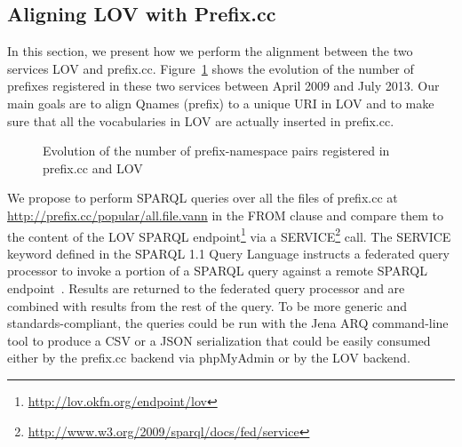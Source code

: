 \subsection{Aligning LOV with Prefix.cc} \label{sec:alignment}
In this section, we present how we perform the alignment between the two services LOV and prefix.cc. Figure~\ref{fig:evolution} shows the evolution of the number of prefixes registered in these two services between April 2009 and July 2013. Our main goals are to align Qnames (prefix) to a unique URI in LOV and to make sure that all the vocabularies in LOV are actually inserted in prefix.cc.

\begin{figure}[ht]
\centering
\resizebox{\textwidth}{!}{

}
\vspace{0.1cm}
\caption{Evolution of the number of prefix-namespace pairs registered in prefix.cc and LOV}
\label{fig:evolution}
\end{figure}

We propose to perform SPARQL queries over all the files of prefix.cc at\\
 \url{http://prefix.cc/popular/all.file.vann} in the FROM clause and compare them to the content of the LOV SPARQL endpoint\footnote{\url{http://lov.okfn.org/endpoint/lov}} via a SERVICE\footnote{\url{http://www.w3.org/2009/sparql/docs/fed/service}} call. The SERVICE keyword defined in the SPARQL 1.1 Query Language instructs a federated query processor to invoke a portion of a SPARQL query against a remote SPARQL endpoint~\cite{eric2013}. Results are returned to the federated query processor and are combined with results from the rest of the query. To be more generic and standards-compliant, the queries could be run with the Jena ARQ command-line tool to produce a CSV or a JSON serialization that could be easily consumed either by the prefix.cc backend via phpMyAdmin or by the LOV backend.

